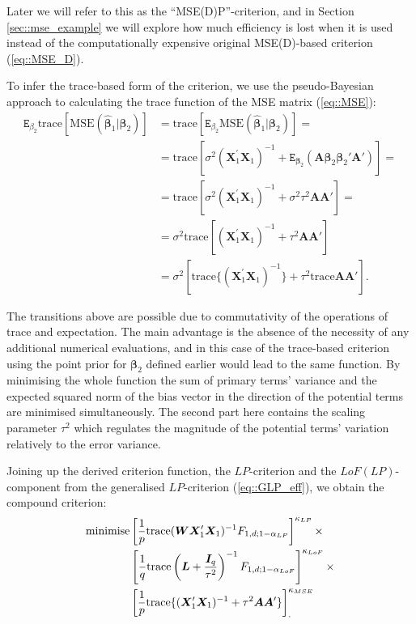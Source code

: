 Later we will refer to this as the ``MSE(D)P''-criterion, and in Section \ref{sec::mse_example} we will explore how much efficiency is lost when it is used instead of the computationally expensive original MSE(D)-based criterion (\ref{eq::MSE_D}).

To infer the trace-based form of the criterion, we use the pseudo-Bayesian approach to calculating the trace function of the MSE matrix (\ref{eq::MSE}): 
\begin{align*}
\mathtt{E}_{\beta_2}\mbox{trace}[\mbox{MSE}(\bm{\hat{\beta}}_1|\bm{\beta}_2)]&=\mbox{trace}[\mathtt{E}_{\beta_2}\mbox{MSE}(\bm{\hat{\beta}}_1|\bm{\beta}_2)]=\\&=\mbox{trace}[\sigma^2(\bm{X}_1^{'}\bm{X}_1)^{-1} + \mathtt{E}_{\bm{\beta}_2}(\bm{A}\bm{\beta}_2\bm{\beta}_2'\bm{A}')]=\\&=\mbox{trace}[\sigma^2(\bm{X}_1^{'}\bm{X}_1)^{-1}+\sigma^2\tau^2\bm{A}\bm{A}']=\\&=\sigma^2\mbox{trace}[(\bm{X}_1^{'}\bm{X}_1)^{-1}+\tau^2\bm{A}\bm{A}']\\&=\sigma^2[\mbox{trace}\{(\bm{X}_1^{'}\bm{X}_1)^{-1}\}+\tau^2\mbox{trace}\bm{A}\bm{A}'].
\end{align*}

The transitions above are possible due to commutativity of the operations of trace and expectation. The main advantage is the absence of the necessity of any additional numerical evaluations, and in this case of the trace-based criterion using the point prior for $\bm{\beta}_2$ defined earlier would lead to the same function. By minimising the whole function the sum of primary terms' variance and the expected squared norm of the bias vector in the direction of the potential terms are minimised simultaneously. The second part here contains the scaling parameter $\tau^2$ which regulates the magnitude of the potential terms' variation relatively to the error variance. 

Joining up the derived criterion function, the $LP$-criterion and the $LoF(LP)$-component from the generalised $LP$-criterion (\ref{eq::GLP_eff}), we obtain the compound criterion:
\begin{align}
\label{eq::MSE_L}
\mbox{minimise} &\left[\frac{1}{p}\mbox{trace}(\bm{WX}'_{1}\bm{X}_{1})^{-1}F_{1,d;1-\alpha_{LP}}\right]^{\kappa_{LP}}\times \notag\\& \left[\frac{1}{q}\mbox{trace}\left(\bm{L}+\frac{\bm{I}_{q}}{\tau^{2}}\right)^{-1}F_{1,d;1-\alpha_{LoF}}\right]^{\kappa_{LoF}}\times 
\notag\\& \left[\frac{1}{p}\mbox{trace}\{(\bm{X}'_{1}\bm{X}_{1})^{-1}+\tau^2\bm{A}\bm{A}'\}\right]^{\kappa_{MSE}}_{.}
\end{align}